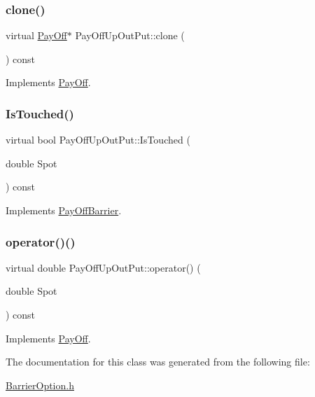 \subsubsection{\texorpdfstring{clone()}{clone()}}
{\footnotesize\ttfamily virtual \hyperlink{classPayOff}{Pay\+Off}$\ast$ Pay\+Off\+Up\+Out\+Put\+::clone (\begin{DoxyParamCaption}{ }\end{DoxyParamCaption}) const\hspace{0.3cm}{\ttfamily [virtual]}}



Implements \hyperlink{classPayOff_ad8194d5b82247ae89c25c515f0ba806a}{Pay\+Off}.

\hypertarget{classPayOffUpOutPut_a4b2900efde69ce09f2b0404729d0d61d}{}\label{classPayOffUpOutPut_a4b2900efde69ce09f2b0404729d0d61d} 
\subsubsection{\texorpdfstring{Is\+Touched()}{IsTouched()}}
{\footnotesize\ttfamily virtual bool Pay\+Off\+Up\+Out\+Put\+::\+Is\+Touched (\begin{DoxyParamCaption}\item[{double}]{Spot }\end{DoxyParamCaption}) const\hspace{0.3cm}{\ttfamily [virtual]}}



Implements \hyperlink{classPayOffBarrier_a2aa9162c618c4f72a6593dc625e1e1e8}{Pay\+Off\+Barrier}.

\hypertarget{classPayOffUpOutPut_a5ed17bb2111a9066eb6d29526a28a113}{}\label{classPayOffUpOutPut_a5ed17bb2111a9066eb6d29526a28a113} 
\subsubsection{\texorpdfstring{operator()()}{operator()()}}
{\footnotesize\ttfamily virtual double Pay\+Off\+Up\+Out\+Put\+::operator() (\begin{DoxyParamCaption}\item[{double}]{Spot }\end{DoxyParamCaption}) const\hspace{0.3cm}{\ttfamily [virtual]}}



Implements \hyperlink{classPayOff_a5ae17d82c233ef5568c8fb0539703000}{Pay\+Off}.



The documentation for this class was generated from the following file\+:\begin{DoxyCompactItemize}
\item 
\hyperlink{BarrierOption_8h}{Barrier\+Option.\+h}\end{DoxyCompactItemize}
